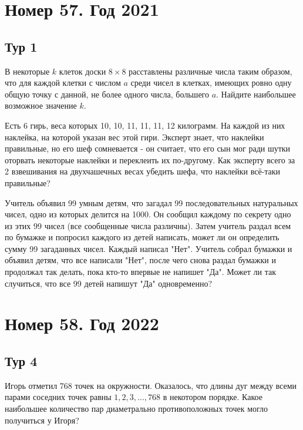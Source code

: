 \documentclass[11pt, a4paper]{common/document_template}
\begin{document}
\chapter{Номер 57. Год 2021}

\section{Тур 1}

\begin{exercise}
В некоторые $k$ клеток доски $8 \times 8$ расставлены различные числа таким образом, что для каждой клетки с числом $a$ среди чисел в клетках, имеющих ровно одну общую точку с данной, не более одного числа, большего $a$. Найдите наибольшее возможное значение $k$.
\end{exercise}

\begin{exercise}
Есть 6 гирь, веса которых 10, 10, 11, 11, 11, 12 килограмм. На каждой из них наклейка, на которой указан вес этой гири. Эксперт знает, что наклейки правильные, но его шеф сомневается - он считает, что его сын мог ради шутки оторвать некоторые наклейки и переклеить их по-другому. Как эксперту всего за 2 взвешивания на
двухчашечных весах убедить шефа, что наклейки всё-таки правильные?
\end{exercise}

\begin{exercise}
Учитель объявил 99 умным детям, что загадал 99 последовательных натуральных чисел, одно из которых делится на 1000. Он сообщил каждому по секрету одно из этих 99 чисел (все сообщенные числа различны). Затем учитель раздал всем по бумажке и попросил каждого из детей написать, может ли он определить сумму 99 загаданных чисел. Каждый написал "Нет". Учитель собрал бумажки и объявил
детям, что все написали "Нет", после чего снова раздал бумажки и продолжал так делать, пока кто-то впервые не напишет "Да". Может ли так случиться, что все 99 детей напишут "Да" одновременно?
\end{exercise}


\chapter{Номер 58. Год 2022}

\section{Тур 4}

\begin{exercise}
Игорь отметил 768 точек на окружности. Оказалось, что длины дуг между
всеми парами соседних точек равны $1, 2, 3, \dots, 768$ в некотором порядке. Какое наибольшее количество пар диаметрально противоположных точек могло получиться у Игоря?
\end{exercise}
\end{document}
